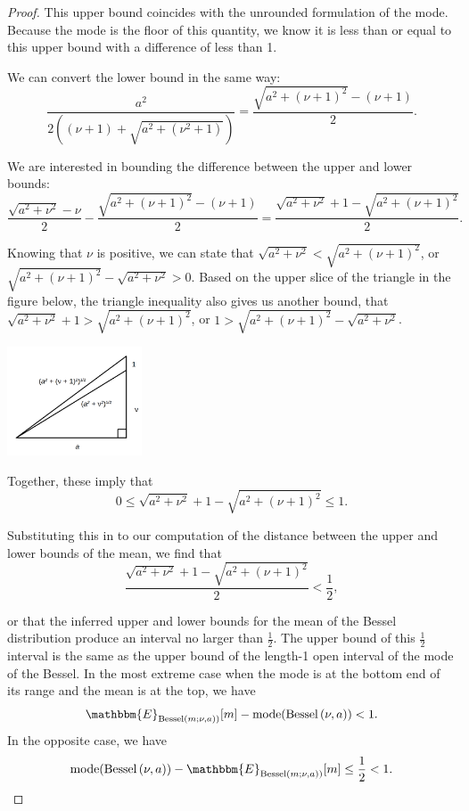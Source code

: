 \documentclass{article}
\newcommand{\Bess}[1]{\textup{Bessel}\left( #1 \right)}
\begin{document}
\begin{proof}
  This upper bound coincides with the unrounded formulation of the mode. Because
  the mode is the floor of this quantity, we know it is less than or equal to
  this upper bound with a difference of less than 1.

  We can convert the lower bound in the same way:
  \begin{equation*}
      \frac{a^2}{2((\nu + 1) + \sqrt{a^2 + (\nu^2 + 1)})} =  \frac{\sqrt{a^2 + (\nu + 1)^2} - (\nu + 1)}{2}.
  \end{equation*}

  We are interested in bounding the difference between the upper and lower
  bounds:
  \begin{equation}
      \frac{\sqrt{a^2 + \nu^2} - \nu}{2} - \frac{\sqrt{a^2 + (\nu + 1)^2} - (\nu + 1)}{2} = 
      \frac{\sqrt{a^2 + \nu^2} + 1 - \sqrt{a^2 + (\nu + 1)^2}}{2}.
  \end{equation}

  Knowing that $\nu$ is positive, we can state that $\sqrt{a^2 + \nu^2} <
  \sqrt{a^2 + (\nu + 1)^2}$, or $\sqrt{a^2 + (\nu + 1)^2} - \sqrt{a^2 + \nu^2} >
  0$. Based on the upper slice of the triangle in the figure below, the triangle
  inequality also gives us another bound, that $\sqrt{a^2 + \nu^2} + 1 >
  \sqrt{a^2 + (\nu + 1)^2}$, or $1 > \sqrt{a^2 + (\nu + 1)^2} - \sqrt{a^2 +
  \nu^2}$.

  \begin{center}
  \includegraphics[width=0.3\textwidth]{figures/triangle-bessel-model}
  \end{center}
  Together, these imply that 
  \[
      0 \leq \sqrt{a^2 + \nu^2} + 1 - \sqrt{a^2 + (\nu + 1)^2} \leq 1.
  \]

  Substituting this in to our computation of the distance between the upper and
  lower bounds of the mean, we find that
  \begin{equation}
  \frac{\sqrt{a^2 + \nu^2} + 1 - \sqrt{a^2 + (\nu + 1)^2}}{2} < \frac{1}{2},
  \end{equation}

  or that the inferred upper and lower bounds for the mean of the Bessel
  distribution produce an interval no larger than $\frac{1}{2}$. The upper bound
  of this $\frac{1}{2}$ interval is the same as the upper bound of the length-1
  open interval of the mode of the Bessel. In the most extreme case when the
  mode is at the bottom end of its range and the mean is at the top, we have
  \[
      \mathbbm{E}_{\Bess{m; \nu, a})}[m] - \textup{mode}(\Bess{\nu, a}) < 1.
  \]
  In the opposite case, we have
  \[
      \textup{mode}(\Bess{\nu, a}) - \mathbbm{E}_{\Bess{m; \nu, a})}[m] \leq \frac{1}{2} < 1.
  \]
\end{proof}



  
\end{document}
